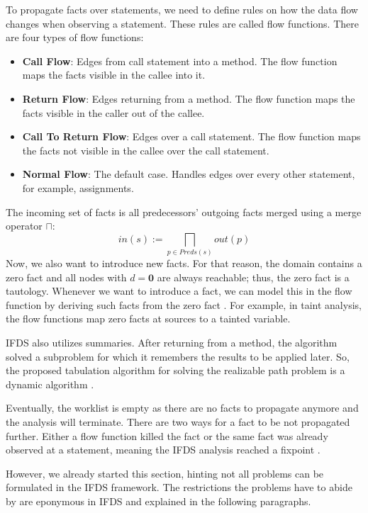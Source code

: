 \documentclass[../draft.tex]{subfiles}
\begin{document}
    To propagate facts over statements, we need to define rules on how the data flow changes when observing a statement. 
    These rules are called flow functions. 
    There are four types of flow functions: \cite{Reps1995}
    \begin{itemize}
        \item \textbf{Call Flow}: Edges from call statement into a method. The flow function maps the facts visible in the callee into it. 
        \item \textbf{Return Flow}: Edges returning from a method. The flow function maps the facts visible in the caller out of the callee.
        \item \textbf{Call To Return Flow}: Edges over a call statement. The flow function maps the facts not visible in the callee over the call statement.
        \item \textbf{Normal Flow}: The default case. Handles edges over every other statement, for example, assignments.
    \end{itemize}
    The incoming set of facts is all predecessors' outgoing facts merged using a merge operator $\sqcap$: 
    $$
        in(s) := \bigsqcap_{p \in Preds(s)} out(p)
    $$
    Now, we also want to introduce new facts. 
    For that reason, the domain contains a zero fact and all nodes with $d=\textbf{0}$ are always reachable; thus, the zero fact is a tautology. 
    Whenever we want to introduce a fact, we can model this in the flow function by deriving such facts from the zero fact  \cite{Reps1995}. 
    For example, in taint analysis, the flow functions map zero facts at sources to a tainted variable. 

    IFDS also utilizes summaries. 
    After returning from a method, the algorithm solved a subproblem for which it remembers the results to be applied later. 
    So, the proposed tabulation algorithm for solving the realizable path problem is a dynamic algorithm \cite{Reps1995}. 

    Eventually, the worklist is empty as there are no facts to propagate anymore and the analysis will terminate.
    There are two ways for a fact to be not propagated further.
    Either a flow function killed the fact or the same fact was already observed at a statement, meaning the IFDS analysis reached a fixpoint \cite{Reps1995}.

    However, we already started this section, hinting not all problems can be formulated in the IFDS framework. 
    The restrictions the problems have to abide by are eponymous in IFDS and explained in the following paragraphs.
\end{document}
